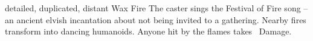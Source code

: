   {detailed, duplicated, distant}%
  {Wax}%
  {Fire}%
  {}%
  {The caster sings the Festival of Fire song -- an ancient elvish incantation about not being invited to a gathering.
    Nearby fires transform into dancing humanoids.
    Anyone hit by the flames takes \showDam\ Damage.
  }%
  {}

